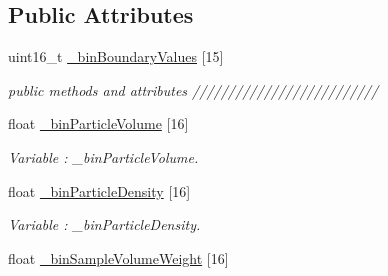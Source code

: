 \subsection*{Public Attributes}
\begin{DoxyCompactItemize}
\item 
uint16\+\_\+t \hyperlink{class_wasp_o_p_c___n2_a385a98a1cf1c93752e278ea680b7c6cc}{\+\_\+bin\+Boundary\+Values} \mbox{[}15\mbox{]}
\begin{DoxyCompactList}\small\item\em public methods and attributes ////////////////////////// \end{DoxyCompactList}\item 
float \hyperlink{class_wasp_o_p_c___n2_a8f6247982589ea87a5d21e35e341a24b}{\+\_\+bin\+Particle\+Volume} \mbox{[}16\mbox{]}\hypertarget{class_wasp_o_p_c___n2_a8f6247982589ea87a5d21e35e341a24b}{}\label{class_wasp_o_p_c___n2_a8f6247982589ea87a5d21e35e341a24b}

\begin{DoxyCompactList}\small\item\em Variable \+: \+\_\+bin\+Particle\+Volume. \end{DoxyCompactList}\item 
float \hyperlink{class_wasp_o_p_c___n2_a31d2d7911d895a56d23ed892cea0e95b}{\+\_\+bin\+Particle\+Density} \mbox{[}16\mbox{]}\hypertarget{class_wasp_o_p_c___n2_a31d2d7911d895a56d23ed892cea0e95b}{}\label{class_wasp_o_p_c___n2_a31d2d7911d895a56d23ed892cea0e95b}

\begin{DoxyCompactList}\small\item\em Variable \+: \+\_\+bin\+Particle\+Density. \end{DoxyCompactList}\item 
float \hyperlink{class_wasp_o_p_c___n2_aa8c98d9dce7aaa94952c5532b69993a4}{\+\_\+bin\+Sample\+Volume\+Weight} \mbox{[}16\mbox{]}\hypertarget{class_wasp_o_p_c___n2_aa8c98d9dce7aaa94952c5532b69993a4}{}\label{class_wasp_o_p_c___n2_aa8c98d9dce7aaa94952c5532b69993a4}


\end{DoxyCompactItemize}
